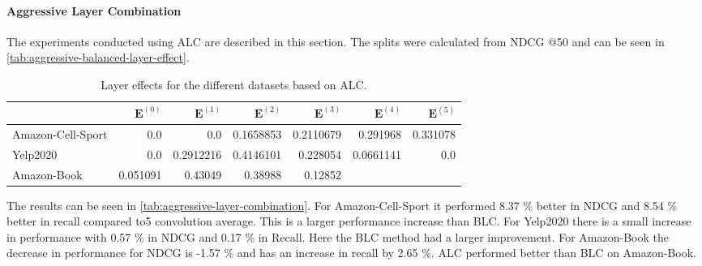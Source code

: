 \paragraph{Aggressive Layer Combination}
The experiments conducted using ALC are described in this section.
The splits were calculated from NDCG @50 and can be seen in \autoref{tab:aggressive-balanced-layer-effect}.
\begin{table*}[]
    \centering
    \begin{tabular}{|l|r|r|r|r|r|r|}
        \hline
                          & $\mathbf{E}^{(0)}$ & $\mathbf{E}^{(1)}$ & $\mathbf{E}^{(2)}$ & $\mathbf{E}^{(3)}$ & $\mathbf{E}^{(4)}$ & $\mathbf{E}^{(5)}$ \\ \hline
        Amazon-Cell-Sport & 0.0                & 0.0                & 0.1658853          & 0.2110679          & 0.291968           & 0.331078           \\ \hline
        Yelp2020          & 0.0                & 0.2912216          & 0.4146101          & 0.228054           & 0.0661141          & 0.0                \\ \hline
        Amazon-Book       & 0.051091           & 0.43049            & 0.38988            & 0.12852            &                    &                    \\ \hline
    \end{tabular}
    \caption{Layer effects for the different datasets based on ALC.}
    \label{tab:aggressive-balanced-layer-effect}
\end{table*}
The results can be seen in \autoref{tab:aggressive-layer-combination}.
For Amazon-Cell-Sport it performed 8.37 \% better in NDCG and 8.54 \% better in recall compared to5 convolution average.
This is a larger performance increase than BLC.
For Yelp2020 there is a small increase in performance with 0.57 \% in NDCG and 0.17 \% in Recall.
Here the BLC method had a larger improvement.
For Amazon-Book the decrease in performance for NDCG is -1.57 \% and has an increase in recall by 2.65 \%.
ALC performed better than BLC on Amazon-Book.
